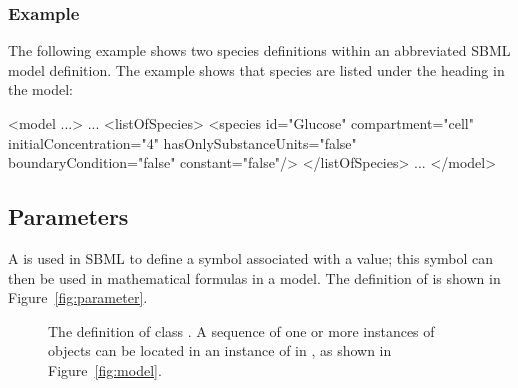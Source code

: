 \subsubsection{Example}

The following example shows two species definitions within an
abbreviated SBML model definition.  The example shows that species
are listed under the heading  in the model:

\begin{example}
<model ...>
    ...
    <listOfSpecies>
        <species id="Glucose" compartment="cell" initialConcentration="4"
                 hasOnlySubstanceUnits="false" boundaryCondition="false" constant="false"/>
    </listOfSpecies>
    ...
</model>
\end{example}


\subsection{Parameters}
\label{sec:parameters}

A \Parameter is used in SBML to define a symbol associated with a
value; this symbol can then be used in mathematical formulas in a
model. The definition of
\Parameter is shown in Figure~\vref{fig:parameter}.

\begin{figure}[htb]
  \centering
  \small
  \caption{The definition of class \Parameter.  A
      sequence of one or more instances of \Parameter objects can
      be located in an instance of \ListOfParameters in \Model, as
      shown in Figure~\protect\ref{fig:model}.}
  \label{fig:parameter}
\end{figure}

